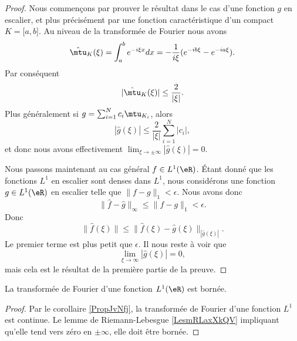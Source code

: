 \begin{proof}
    Nous commençons par prouver le résultat dans le cas d'une fonction \( g\) en escalier, et plus précisément par une fonction caractéristique d'un compact \( K=\mathopen[ a , b \mathclose]\). Au niveau de la transformée de Fourier nous avons
    \begin{equation}
        \hat\mtu_{K}(\xi)=\int_a^b e^{-i\xi x}dx=-\frac{1}{ i\xi }( e^{-ib\xi}- e^{-ia\xi}).
    \end{equation}
    Par conséquent
    \begin{equation}
        | \hat\mtu_K(\xi) |\leq \frac{ 2 }{ | \xi | }.
    \end{equation}
    Plus généralement si \( g=\sum_{i=1}^Nc_i\mtu_{K_i}\), alors
    \begin{equation}
        | \hat g(\xi) |\leq \frac{ 2 }{ | \xi | }\sum_{i=1}^N| c_i |,
    \end{equation}
    et donc nous avons effectivement \( \lim_{\xi\to\pm\infty}| \hat g(\xi) |=0\).

    Nous passons maintenant au cas général \( f\in L^1(\eR)\). Étant donné que les fonctions \( L^1\) en escalier sont denses dans \( L^1\), nous considérons une fonction \( g\in L^1(\eR)\) en escalier telle que \( \| f-g \|_1<\epsilon\). Nous avons donc
    \begin{equation}
        \| \hat f-\hat g \|_{\infty}\leq \| f-g \|_1<\epsilon.
    \end{equation}
    Donc
    \begin{equation}
        \| \hat f(\xi) \|\leq \| \hat f(\xi)-\hat g(\xi) \|_| \hat g(\xi) |.
    \end{equation}
    Le premier terme est plus petit que \( \epsilon\). Il nous reste à voir que 
    \begin{equation}
        \lim_{\xi\to \infty} | \hat g(\xi) |=0,
    \end{equation}
    mais cela est le résultat de la première partie de la preuve.    
\end{proof}

\begin{corollary}
    La transformée de Fourier d'une fonction \( L^1(\eR)\) est bornée.
\end{corollary}

\begin{proof}
    Par le corollaire \ref{PropJvNfj}, la transformée de Fourier d'une fonction \( L^1\) est continue. Le lemme de Riemann-Lebesgue \ref{LesmRLaxXkQV} impliquant qu'elle tend vers zéro en \( \pm\infty\), elle doit être bornée.    
\end{proof}

